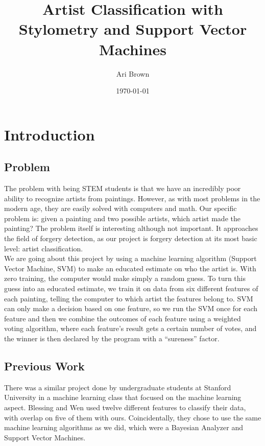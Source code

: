 \documentclass[twocolumn]{article}
\title{Artist Classification with Stylometry and Support Vector Machines}
\author{Ari Brown}
\date{\today}
\begin{document}
  \maketitle

  \section{Introduction}
  \subsection{Problem}
  The problem with being STEM students is that we have an incredibly poor ability
  to recognize artists from paintings. However, as with most problems in the
  modern age, they are easily solved with computers and math. Our specific problem
  is: given a painting and two possible artists, which artist made the painting?
  The problem itself is interesting although not important. It approaches the
  field of forgery detection, as our project is forgery detection at its most
  basic level: artist classification. \\
  
  We are going about this project by using a machine learning algorithm (Support
  Vector Machine, SVM) to make an educated estimate on who the artist is. With
  zero training, the computer would make simply a random guess. To turn this guess
  into an educated estimate, we train it on data from six different features of
  each painting, telling the computer to which artist the features belong to.
  SVM can only make a decision based on one feature, so we run the SVM once for
  each feature and then we combine the outcomes of each feature using a weighted
  voting algorithm, where each feature's result gets a certain number of votes,
  and the winner is then declared by the program with a ``sureness'' factor.

  \subsection{Previous Work}
  There was a similar project done by undergraduate students at Stanford
  University in a machine learning class that focused on the machine learning
  aspect. Blessing and Wen used twelve different features to classify their
  data, with overlap on five of them with ours. Coincidentally, they chose to
  use the same machine learning algorithms as we did, which were a Bayesian
  Analyzer and Support Vector Machines. \\
  
\end{document}
